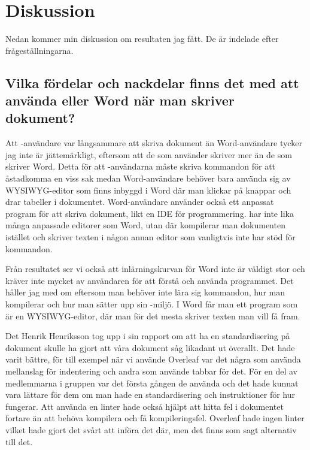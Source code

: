 \section{Diskussion}
\label{sec:discussion-tuhkala}
Nedan kommer min diskussion om resultaten jag fått. De är indelade efter frågeställningarna.

\subsection{Vilka fördelar och nackdelar finns det med att använda \latex eller Word när man skriver dokument?}
Att \latex-användare var långsammare att skriva dokument än Word-användare tycker jag inte är jättemärkligt, eftersom att de som använder \latex skriver mer än de som skriver Word. Detta för att \latex-användarna måste skriva kommandon för att åstadkomma en viss sak medan Word-användare behöver bara använda sig av WYSIWYG-editor som finns inbyggd i Word där man klickar på knappar och drar tabeller i dokumentet. Word-användare använder också ett anpassat program för att skriva dokument, likt en IDE för programmering. \latex har inte lika många anpassade editorer som Word, utan där kompilerar man dokumenten istället och skriver texten i någon annan editor som vanligtvis inte har stöd för \latex kommandon.

Från resultatet ser vi också att inlärningskurvan för Word inte är väldigt stor och kräver inte mycket av användaren för att förstå och använda programmet. Det håller jag med om eftersom man behöver inte lära sig kommandon, hur man kompilerar och hur man sätter upp sin \latex-miljö. I Word får man ett program som är en WYSIWYG-editor, där man för det mesta skriver texten man vill få fram.

Det Henrik Henriksson tog upp i sin rapport om att ha en standardisering på \latex dokument skulle ha gjort att våra dokument såg likadant ut överallt. Det hade varit bättre, för till exempel när vi använde Overleaf var det några som använda mellanslag för indentering och andra som använde tabbar för det. För en del av medlemmarna i gruppen var det första gången de använda \latex och det hade kunnat vara lättare för dem om man hade en standardisering och instruktioner för hur \latex fungerar. Att använda en linter hade också hjälpt att hitta fel i dokumentet fortare än att behöva kompilera och få kompileringsfel. Overleaf hade ingen linter vilket hade gjort det svårt att införa det där, men det finns som sagt alternativ till det.

